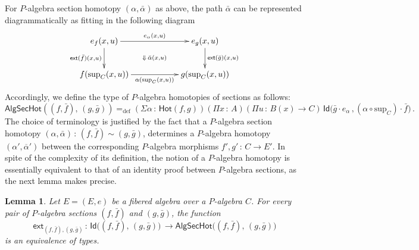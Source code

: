 \documentclass[10pt,a4paper,oneside,reqno]{amsart}
\numberwithin{equation}{section}
\theoremstyle{mythm}
\newtheorem{lemma}[theorem]{Lemma}
\theoremstyle{mydef}
\theoremstyle{myrmk}
\newcommand{\defeq}{=_{\mathrm{def}}}
\newcommand{\co}{\,{:}\,}
\newcommand{\ct}{\cdot}
\newcommand{\Hot}{\mathsf{Hot}}
\newcommand{\ext}{\mathsf{ext}}
\newcommand{\Id}{\mathsf{Id}}
\renewcommand{\sup}{\mathrm{sup}}
\newcommand{\AlgSecHot}{\mathsf{AlgSecHot}}
\begin{document}
For $P$-algebra section homotopy $(\alpha, \bar{\alpha})$ as above, the path $\bar{\alpha}$ can be
represented diagrammatically as fitting in the following diagram
\[
\xymatrix@C=2cm{
e_f(x,u) \ar[r]^{e_\alpha(x,u)} \ar[d]_{\ext(\bar{f})(x,u)} 
\ar@{}[dr]|{\Downarrow \, \bar{\alpha}(x,u)}  
& e_g(x,u) \ar[d]^{\ext(\bar{g})(x,u)}  \\
f ( \sup_C(x,u)) \ar[r]_{\alpha( \sup_C(x,u))}  & g(\sup_C(x,u))}
\]
Accordingly, we define the type of $P$-algebra homotopies of sections as follows:
\[
\AlgSecHot( (f, \bar{f}) ,\, (g, \bar{g}) )  \defeq 
(\Sigma \alpha \co \Hot( f , g)) 
(\Pi x \co A) 
(\Pi u \co B(x) \to C) \, 
\Id\big(  \bar{g}  \ct e_\alpha \, , 
(\alpha \circ \sup_C) \ct \bar{f} \big) \, .
\]
The choice of terminology is justified by the fact that  a 
$P$-algebra section homotopy $(\alpha, \bar{\alpha}) \co (f, \bar{f}) \sim (g, \bar{g})$, 
determines a $P$-algebra homotopy 
$(\alpha', \overline{\alpha}')$ between the corresponding $P$-algebra morphisms $f', g' \co C \to E'$.
In spite of the complexity of its definition, the notion of a $P$-algebra homotopy is essentially equivalent to
that of an identity proof between $P$-algebra sections, as the next lemma makes precise. 

\begin{lemma}\label{lem:fibhomeqid} Let $E = (E, e)$ be a fibered algebra over a $P$-algebra $C$.
For every pair of $P$-algebra sections $(f, \bar{f})$ and $(g, \bar{g})$,  the function
\[
\ext_{(f, \bar{f}), (g, \bar{g})} \co \Id \big( (f, \bar{f}) ,\, (g, \bar{g}) \big) \, \to
\AlgSecHot\big( (f, \bar{f}) ,\, (g, \bar{g}) \big) 
\]
is an equivalence of types.
\end{lemma}
\end{document}
